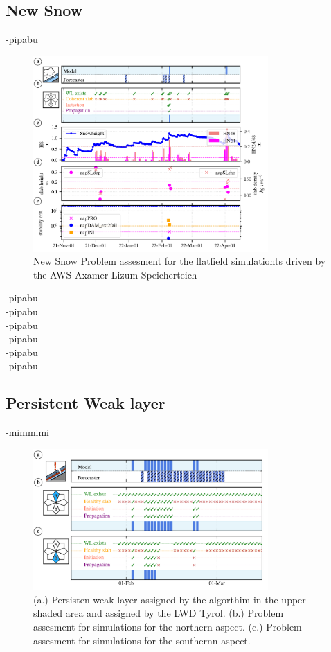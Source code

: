 \subsection{New Snow}

-pipabu

\begin{figure}[h]
    \centering
    \includegraphics[width=0.8\textwidth]{Figures/figures_avapro/AXLIZ/new_snow_AXLIZ.png}
    \caption{New Snow Problem assesment for the flatfield simulationts driven by the AWS-Axamer Lizum Speicherteich}
    \label{fig:New_Snow_AXLIZ}
\end{figure}

-pipabu \\
-pipabu\\
-pipabu\\
-pipabu\\
-pipabu\\
-pipabu\\


\subsection{Persistent Weak layer}

-mimmimi

\begin{figure}[h]
    \centering
    \includegraphics[width=0.8\textwidth]{Figures/figures_avapro/AXLIZ/persitent_N_S_AXLIZ.png}
    \caption{ (a.) Persisten weak layer assigned by the algorthim in the upper shaded area and assigned by the LWD Tyrol.
     (b.) Problem assesment for simulations for the northern aspect. (c.) Problem assesment for simulations for the southernn aspect.
     }
    \label{fig:PAP_N_S_AXLIZ}

\end{figure}

